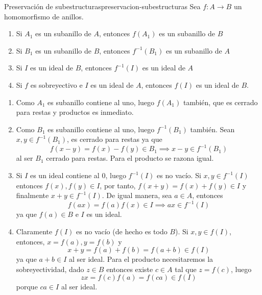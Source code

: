 \begin{proposition}{Preservación de subestructuras}{preservacion-subestructuras}
    Sea \(f: A \to B\) un homomorfismo de anillos.
    \begin{enumerate}
        \item Si \(A_1\) es un subanillo de \(A\), entonces \(f(A_1)\) es un subanillo de \(B\)
        \item Si \(B_1\) es un subanillo de \(B\), entonces \(f^{-1}(B_1)\) es un subanillo de \(A\)
        \item Si \(I\) es un ideal de \(B\), entonces \(f^{-1}(I)\) es un ideal de \(A\)
        \item Si \(f\) es sobreyectivo e \(I\) es un ideal de \(A\), entonces \(f(I)\) es un ideal de \(B\).
    \end{enumerate}
\end{proposition}

\begin{proofbox}
    \begin{enumerate}
        \item Como $A_1$ es subanillo contiene al uno, luego $f(A_1)$ también, que es cerrado para restas y productos es inmediato.
        \item Como $B_1$ es subanillo contiene al uno, luego $f^{-1}(B_1)$ también. Sean $x, y \in f^{-1}(B_1)$, es cerrado para restas ya que
        \[
            f(x - y) = f(x) - f(y) \in B_1 \implies x - y \in f^{-1}(B_1)
        \]
        al ser $B_1$ cerrado para restas. Para el producto se razona igual.
        \item Si \(I\) es un ideal contiene al $0$, luego \(f^{-1}(I)\) es no vacío. Si $x,y \in f^{-1}(I)$ entonces $f(x),f(y) \in I$, por tanto, $f(x + y) = f(x) + f(y) \in I$ y finalmente $x + y \in f^{-1}(I)$. De igual manera, sea $a \in A$, entonces
        \[
        f(ax) = f(a)f(x) \in I \implies ax \in f^{-1}(I)
        \]
        ya que $f(a) \in B$ e $I$ es un ideal.
        \item Claramente $f(I)$ es no vacío (de hecho es todo $B$). Si $x,y \in f(I)$, entonces, $x = f(a), y = f(b)$ y 
        \[
        x + y = f(a) + f(b) = f(a + b) \in f(I)
        \]
        ya que $a + b \in I$ al ser ideal. Para el producto necesitaremos la sobreyectividad, dado $z \in B$ entonces existe $c\in A$ tal que $z = f(c)$, luego
        \[
        zx = f(c)f(a) = f(ca) \in f(I)
        \]
        porque $ca \in I$ al ser ideal.

    \end{enumerate}
\end{proofbox}

